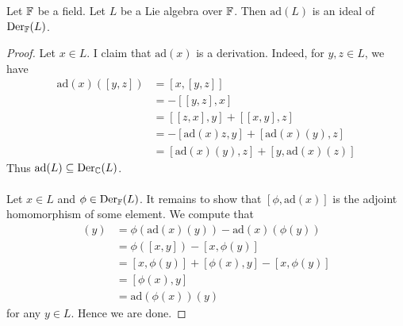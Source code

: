 \documentclass[a4paper]{article}
\begin{document}
\begin{lmm}{}{} Let $\mathbb{F}$ be a field. Let $L$ be a Lie algebra over $\mathbb{F}$. Then $\text{ad}(L)$ is an ideal of $\text{Der}_{\mathbb{F}}(L)$. \tcbline
\begin{proof}
Let $x\in L$. I claim that $\text{ad}(x)$ is a derivation. Indeed, for $y,z\in L$, we have 
\begin{align*}
\text{ad}(x)([y,z])&=[x,[y,z]]\\
&=-[[y,z],x]\\
&=[[z,x],y]+[[x,y],z]\\
&=-[\text{ad}(x)z,y]+[\text{ad}(x)(y),z]\\
&=[\text{ad}(x)(y),z]+[y,\text{ad}(x)(z)]
\end{align*}
Thus $\text{ad}(L)\subseteq\text{Der}_{\mathbb{C}}(L)$. \\~\\

Let $x\in L$ and $\phi\in\text{Der}_{\mathbb{F}}(L)$. It remains to show that $[\phi,\text{ad}(x)]$ is the adjoint homomorphism of some element. We compute that 
\begin{align*}
[\phi,\text{ad}(x)](y)&=\phi(\text{ad}(x)(y))-\text{ad}(x)(\phi(y))\\
&=\phi([x,y])-[x,\phi(y)]\\
&=[x,\phi(y)]+[\phi(x),y]-[x,\phi(y)]\\
&=[\phi(x),y]\\
&=\text{ad}(\phi(x))(y)
\end{align*}
for any $y\in L$. Hence we are done. 
\end{proof}
\end{lmm}
\end{document}
